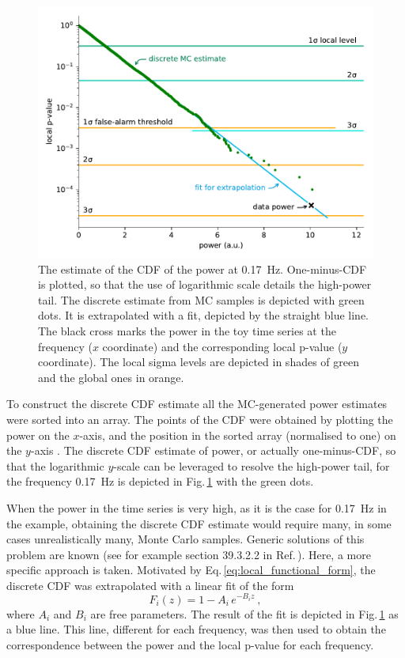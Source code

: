\begin{figure}
  \centering
  \includegraphics[width=\linewidth]{gfx/axions/MC_estimation_local.pdf}
  \caption{The estimate of the CDF of the power at \SI{0.17}{\hertz}. One-minus-CDF is plotted, so that the use of logarithmic scale details the high-power tail. The discrete estimate from MC samples is depicted with green dots. It is extrapolated with a fit, depicted by the straight blue line. The black cross marks the power in the toy time series at the frequency ($x$ coordinate) and the corresponding local p-value ($y$ coordinate). The local sigma levels are depicted in shades of green and the global ones in orange.}\label{fig:P_best_signal_candidate}
\end{figure}

To construct the discrete CDF estimate all the MC-generated power estimates were sorted into an array. The points of the CDF were obtained by plotting the power on the $x$-axis, and the position in the sorted array (normalised to one) on the $y$-axis .
The discrete CDF estimate of power, or actually one-minus-CDF, so that the logarithmic $y$-scale can be leveraged to resolve the high-power tail, for the frequency \SI{0.17}{\hertz} is depicted in Fig.\,\ref{fig:P_best_signal_candidate} with the green dots.

When the power in the time series is very high, as it is the case for \SI{0.17}{\hertz} in the example, obtaining the discrete CDF estimate would require many, in some cases unrealistically many, Monte Carlo samples. Generic solutions of this problem are known (see for example section 39.3.2.2 in Ref.\,\cite{PDG2016}). Here, a more specific approach is taken. Motivated by Eq.\,\ref{eq:local_functional_form}, the discrete CDF was extrapolated with a linear fit of the form
\begin{equation}
  F_i(z) = 1 - A_i \, e^{-B_i z} \ ,
\end{equation}
where $A_i$ and $B_i$ are free parameters. The result of the fit is depicted in Fig.\,\ref{fig:P_best_signal_candidate} as a blue line. This line, different for each frequency, was then used to obtain the correspondence between the power and the local p-value for each frequency.


